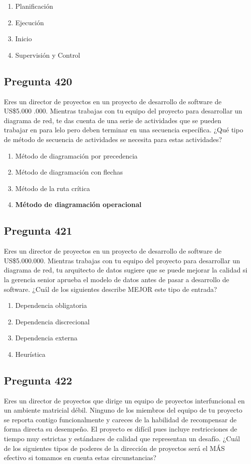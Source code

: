 \documentclass[11pt,a4paper]{article}
\begin{document}
\begin{enumerate}[label=\alph*)]
  \item Planificación
  \item Ejecución
  \item Inicio
  \item Supervisión y Control
\end{enumerate}

\subsection*{Pregunta 420}
Eres un director de proyectos en un proyecto de desarrollo de software de US\$5.000 .000. Mientras trabajas con tu equipo del proyecto para desarrollar un diagrama de red, te das cuenta de una serie de actividades que se pueden trabajar en para lelo pero deben terminar en una secuencia específica. ¿Qué tipo de método de secuencia de actividades se necesita para estas actividades?

\begin{enumerate}[label=\alph*)]
  \item Método de diagramación por precedencia
  \item Método de diagramación con flechas
  \item Método de la ruta crítica
  \item \textbf{Método de diagramación operacional}
\end{enumerate}

\subsection*{Pregunta 421}
Eres un director de proyectos en un proyecto de desarrollo de software de US\$5.000.000. Mientras trabajas con tu equipo del proyecto para desarrollar un diagrama de red, tu arquitecto de datos sugiere que se puede mejorar la calidad si la gerencia senior aprueba el modelo de datos antes de pasar a desarrollo de software. ¿Cuál de los siguientes describe MEJOR este tipo de entrada?

\begin{enumerate}[label=\alph*)]
  \item Dependencia obligatoria
  \item Dependencia discrecional
  \item Dependencia externa
  \item Heurística
\end{enumerate}

\subsection*{Pregunta 422}
Eres un director de proyectos que dirige un equipo de proyectos interfuncional en un ambiente matricial débil. Ninguno de los miembros del equipo de tu proyecto se reporta contigo funcionalmente y careces de la habilidad de recompensar de forma directa su desempeño. El proyecto es difícil pues incluye restricciones de tiempo muy estrictas y estándares de calidad que representan un desafío. ¿Cuál de los siguientes tipos de poderes de la dirección de proyectos será el MÁS efectivo si tomamos en cuenta estas circunstancias?
\end{document}
